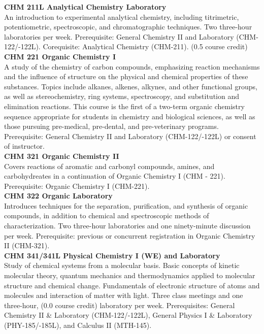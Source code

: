 \documentclass[
  letterpaper,
]{scrbook}
\begin{document}
\textbf{CHM 211L Analytical Chemistry Laboratory}\\
An introduction to experimental analytical chemistry, including
titrimetric, potentiometric, spectroscopic, and chromatographic
techniques. Two three-hour laboratories per week. Prerequisite: General
Chemistry II and Laboratory (CHM-122/-122L). Corequisite: Analytical
Chemistry (CHM-211). (0.5 course credit)\\
\textbf{CHM 221 Organic Chemistry I}\\
A study of the chemistry of carbon compounds, emphasizing reaction
mechanisms and the influence of structure on the physical and chemical
properties of these substances. Topics include alkanes, alkenes,
alkynes, and other functional groups, as well as stereochemistry, ring
systems, spectroscopy, and substitution and elimination reactions. This
course is the first of a two-term organic chemistry sequence appropriate
for students in chemistry and biological sciences, as well as those
pursuing pre-medical, pre-dental, and pre-veterinary programs.
Prerequisite: General Chemistry II and Laboratory (CHM-122/-122L) or
consent of instructor.\\
\textbf{CHM 321 Organic Chemistry II}\\
Covers reactions of aromatic and carbonyl compounds, amines, and
carbohydreates in a continuation of Organic Chemistry I (CHM - 221).
Prerequisite: Organic Chemistry I (CHM-221).\\
\textbf{CHM 322 Organic Laboratory}\\
Introduces techniques for the separation, purification, and synthesis of
organic compounds, in addition to chemical and spectroscopic methods of
characterization. Two three-hour laboratories and one ninety-minute
discussion per week. Prerequisite: previous or concurrent registration
in Organic Chemistry II (CHM-321).\\
\textbf{CHM 341/341L Physical Chemistry I (WE) and Laboratory}\\
Study of chemical systems from a molecular basis. Basic concepts of
kinetic molecular theory, quantum mechanics and thermodynamics applied
to molecular structure and chemical change. Fundamentals of electronic
structure of atoms and molecules and interaction of matter with light.
Three class meetings and one three-hour, (0.0 course credit) laboratory
per week. Prerequisites: General Chemistry II \& Laboratory
(CHM-122/-122L), General Physics I \& Laboratory (PHY-185/-185L), and
Calculus II (MTH-145).\\
\end{document}
